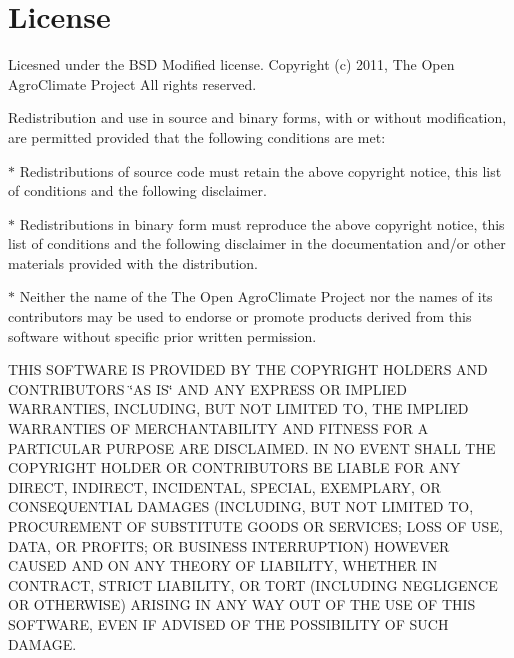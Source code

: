 \hypertarget{index_License}{}\section{\-License}\label{index_License}
\-Licesned under the \-B\-S\-D \-Modified license. \-Copyright (c) 2011, \-The \-Open \-Agro\-Climate \-Project \-All rights reserved.

\-Redistribution and use in source and binary forms, with or without modification, are permitted provided that the following conditions are met\-:

$\ast$ \-Redistributions of source code must retain the above copyright notice, this list of conditions and the following disclaimer.

$\ast$ \-Redistributions in binary form must reproduce the above copyright notice, this list of conditions and the following disclaimer in the documentation and/or other materials provided with the distribution.

$\ast$ \-Neither the name of the \-The \-Open \-Agro\-Climate \-Project nor the names of its contributors may be used to endorse or promote products derived from this software without specific prior written permission.

\-T\-H\-I\-S \-S\-O\-F\-T\-W\-A\-R\-E \-I\-S \-P\-R\-O\-V\-I\-D\-E\-D \-B\-Y \-T\-H\-E \-C\-O\-P\-Y\-R\-I\-G\-H\-T \-H\-O\-L\-D\-E\-R\-S \-A\-N\-D \-C\-O\-N\-T\-R\-I\-B\-U\-T\-O\-R\-S \char`\"{}\-A\-S I\-S\char`\"{} \-A\-N\-D \-A\-N\-Y \-E\-X\-P\-R\-E\-S\-S \-O\-R \-I\-M\-P\-L\-I\-E\-D \-W\-A\-R\-R\-A\-N\-T\-I\-E\-S, \-I\-N\-C\-L\-U\-D\-I\-N\-G, \-B\-U\-T \-N\-O\-T \-L\-I\-M\-I\-T\-E\-D \-T\-O, \-T\-H\-E \-I\-M\-P\-L\-I\-E\-D \-W\-A\-R\-R\-A\-N\-T\-I\-E\-S \-O\-F \-M\-E\-R\-C\-H\-A\-N\-T\-A\-B\-I\-L\-I\-T\-Y \-A\-N\-D \-F\-I\-T\-N\-E\-S\-S \-F\-O\-R \-A \-P\-A\-R\-T\-I\-C\-U\-L\-A\-R \-P\-U\-R\-P\-O\-S\-E \-A\-R\-E \-D\-I\-S\-C\-L\-A\-I\-M\-E\-D. \-I\-N \-N\-O \-E\-V\-E\-N\-T \-S\-H\-A\-L\-L \-T\-H\-E \-C\-O\-P\-Y\-R\-I\-G\-H\-T \-H\-O\-L\-D\-E\-R \-O\-R \-C\-O\-N\-T\-R\-I\-B\-U\-T\-O\-R\-S \-B\-E \-L\-I\-A\-B\-L\-E \-F\-O\-R \-A\-N\-Y \-D\-I\-R\-E\-C\-T, \-I\-N\-D\-I\-R\-E\-C\-T, \-I\-N\-C\-I\-D\-E\-N\-T\-A\-L, \-S\-P\-E\-C\-I\-A\-L, \-E\-X\-E\-M\-P\-L\-A\-R\-Y, \-O\-R \-C\-O\-N\-S\-E\-Q\-U\-E\-N\-T\-I\-A\-L \-D\-A\-M\-A\-G\-E\-S (\-I\-N\-C\-L\-U\-D\-I\-N\-G, \-B\-U\-T \-N\-O\-T \-L\-I\-M\-I\-T\-E\-D \-T\-O, \-P\-R\-O\-C\-U\-R\-E\-M\-E\-N\-T \-O\-F \-S\-U\-B\-S\-T\-I\-T\-U\-T\-E \-G\-O\-O\-D\-S \-O\-R \-S\-E\-R\-V\-I\-C\-E\-S; \-L\-O\-S\-S \-O\-F \-U\-S\-E, \-D\-A\-T\-A, \-O\-R \-P\-R\-O\-F\-I\-T\-S; \-O\-R \-B\-U\-S\-I\-N\-E\-S\-S \-I\-N\-T\-E\-R\-R\-U\-P\-T\-I\-O\-N) \-H\-O\-W\-E\-V\-E\-R \-C\-A\-U\-S\-E\-D \-A\-N\-D \-O\-N \-A\-N\-Y \-T\-H\-E\-O\-R\-Y \-O\-F \-L\-I\-A\-B\-I\-L\-I\-T\-Y, \-W\-H\-E\-T\-H\-E\-R \-I\-N \-C\-O\-N\-T\-R\-A\-C\-T, \-S\-T\-R\-I\-C\-T \-L\-I\-A\-B\-I\-L\-I\-T\-Y, \-O\-R \-T\-O\-R\-T (\-I\-N\-C\-L\-U\-D\-I\-N\-G \-N\-E\-G\-L\-I\-G\-E\-N\-C\-E \-O\-R \-O\-T\-H\-E\-R\-W\-I\-S\-E) \-A\-R\-I\-S\-I\-N\-G \-I\-N \-A\-N\-Y \-W\-A\-Y \-O\-U\-T \-O\-F \-T\-H\-E \-U\-S\-E \-O\-F \-T\-H\-I\-S \-S\-O\-F\-T\-W\-A\-R\-E, \-E\-V\-E\-N \-I\-F \-A\-D\-V\-I\-S\-E\-D \-O\-F \-T\-H\-E \-P\-O\-S\-S\-I\-B\-I\-L\-I\-T\-Y \-O\-F \-S\-U\-C\-H \-D\-A\-M\-A\-G\-E. 